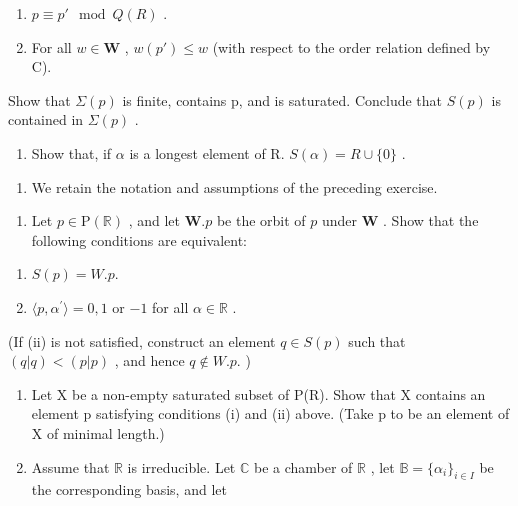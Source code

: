 \begin{enumerate}
\def\labelenumi{(\roman{enumi})}
\item
  \(p \equiv p' \mod Q(R)\) .
\item
  For all \(w \in \mathbf{W}\) , \(w(p') \leqslant w\) (with respect to the order relation defined by C).
\end{enumerate}

Show that \(\Sigma(p)\) is finite, contains p, and is saturated. Conclude that \(S(p)\) is contained in \(\Sigma(p)\) .

\begin{enumerate}
\def\labelenumi{\alph{enumi})}
\setcounter{enumi}{3}
\tightlist
\item
  Show that, if \(\alpha\) is a longest element of R. \(S(\alpha) = R \cup \{0\}\) .
\end{enumerate}

\begin{enumerate}
\def\labelenumi{\arabic{enumi})}
\setcounter{enumi}{23}
\tightlist
\item
  We retain the notation and assumptions of the preceding exercise.
\end{enumerate}

\begin{enumerate}
\def\labelenumi{\alph{enumi})}
\tightlist
\item
  Let \(p \in \mathrm{P}(\mathbb{R})\) , and let \(\mathbf{W}.p\) be the orbit of \(p\) under \(\mathbf{W}\) . Show that the following conditions are equivalent:
\end{enumerate}

\begin{enumerate}
\def\labelenumi{(\roman{enumi})}
\item
  \(S(p) = W.p.\)
\item
  \(\langle p, \alpha^{\prime} \rangle = 0, 1\) or \(-1\) for all \(\alpha \in \mathbb{R}\) .
\end{enumerate}

(If (ii) is not satisfied, construct an element \(q \in S(p)\) such that \((q|q) < (p|p)\) , and hence \(q \notin W.p.\) )

\begin{enumerate}
\def\labelenumi{\alph{enumi})}
\setcounter{enumi}{1}
\item
  Let X be a non-empty saturated subset of P(R). Show that X contains an element p satisfying conditions (i) and (ii) above. (Take p to be an element of X of minimal length.)
\item
  Assume that \(\mathbb{R}\) is irreducible. Let \(\mathbb{C}\) be a chamber of \(\mathbb{R}\) , let \(\mathbb{B} = \{\alpha_i\}_{i\in I}\) be the corresponding basis, and let
\end{enumerate}

